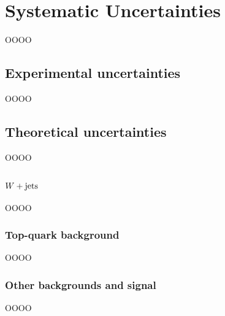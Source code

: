\chapter{Systematic Uncertainties}
\label{chap:chapter-9}

OOOO

\section{Experimental uncertainties}
\label{heading:Chapters-CH9-2}

OOOO

\section{Theoretical uncertainties}
\label{heading:Chapters-CH9-3}

OOOO

\subsection{$W+\mathrm{jets}$}
\label{heading:Chapters-CH9-4}

OOOO

\subsection{Top-quark background}
\label{heading:Chapters-CH9-5}

OOOO

\subsection{Other backgrounds and signal}
\label{heading:Chapters-CH9-6}

OOOO

